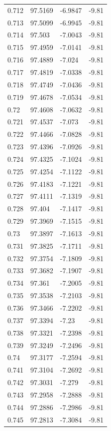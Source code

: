 \begin{tabular}{llll}
0.712 & 97.5169 & -6.9847 & -9.81 \\
0.713 & 97.5099 & -6.9945 & -9.81 \\
0.714 & 97.503 & -7.0043 & -9.81 \\
0.715 & 97.4959 & -7.0141 & -9.81 \\
0.716 & 97.4889 & -7.024 & -9.81 \\
0.717 & 97.4819 & -7.0338 & -9.81 \\
0.718 & 97.4749 & -7.0436 & -9.81 \\
0.719 & 97.4678 & -7.0534 & -9.81 \\
0.72 & 97.4608 & -7.0632 & -9.81 \\
0.721 & 97.4537 & -7.073 & -9.81 \\
0.722 & 97.4466 & -7.0828 & -9.81 \\
0.723 & 97.4396 & -7.0926 & -9.81 \\
0.724 & 97.4325 & -7.1024 & -9.81 \\
0.725 & 97.4254 & -7.1122 & -9.81 \\
0.726 & 97.4183 & -7.1221 & -9.81 \\
0.727 & 97.4111 & -7.1319 & -9.81 \\
0.728 & 97.404 & -7.1417 & -9.81 \\
0.729 & 97.3969 & -7.1515 & -9.81 \\
0.73 & 97.3897 & -7.1613 & -9.81 \\
0.731 & 97.3825 & -7.1711 & -9.81 \\
0.732 & 97.3754 & -7.1809 & -9.81 \\
0.733 & 97.3682 & -7.1907 & -9.81 \\
0.734 & 97.361 & -7.2005 & -9.81 \\
0.735 & 97.3538 & -7.2103 & -9.81 \\
0.736 & 97.3466 & -7.2202 & -9.81 \\
0.737 & 97.3394 & -7.23 & -9.81 \\
0.738 & 97.3321 & -7.2398 & -9.81 \\
0.739 & 97.3249 & -7.2496 & -9.81 \\
0.74 & 97.3177 & -7.2594 & -9.81 \\
0.741 & 97.3104 & -7.2692 & -9.81 \\
0.742 & 97.3031 & -7.279 & -9.81 \\
0.743 & 97.2958 & -7.2888 & -9.81 \\
0.744 & 97.2886 & -7.2986 & -9.81 \\
0.745 & 97.2813 & -7.3084 & -9.81 \\

\end{tabular}
